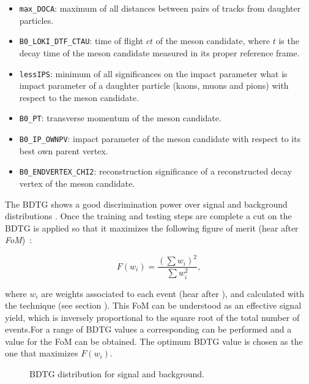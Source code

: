 \begin{itemize}
\item{} \texttt{max\_DOCA}: maximum of all distances between pairs of tracks from daughter particles.
\item{} \texttt{B0\_LOKI\_DTF\_CTAU}: time of flight $ct$ of the \Bs meson candidate, where
$t$ is the decay time of the \Bs meson candidate measured in its proper reference frame.
\item{} \texttt{lessIPS}: minimum of all significances on the impact parameter {\color{red} what is impact parameter} of a daughter particle (kaons, muons and pions) with respect to the \Bs meson candidate.
\item{} \texttt{B0\_PT}: transverse momentum of the \Bs meson candidate.
\item{} \texttt{B0\_IP\_OWNPV}: impact parameter of the \Bs meson candidate with respect to its best own parent vertex.
\item{} \texttt{B0\_ENDVERTEX\_CHI2}: reconstruction significance of a reconstructed decay vertex of the \Bs meson candidate.
\end{itemize}

The BDTG shows a good discrimination power over signal and background distributions .
Once the training and testing steps are complete a cut on the BDTG is applied so that it maximizes the following figure of merit
(hear after {\it FoM})~\cite{Yuehong_fom}:

\begin{equation}
\label{eqn:fom}
F(w_i) = \frac{\left(\sum{w_{i}}\right)^2}{\sum{w_{i}^2}},
\end{equation}

\noindent where $w_i$ are weights associated to each event (hear after \sWeights), and calculated with the \sPlot technique (see section ). 
This FoM can be understood as an effective signal yield, which is inversely proportional to the square root of the total number of events.For a range of BDTG values
a corresponding \sPlot can be performed and a value for the FoM can be obtained. The optimum BDTG value is chosen as the one that maximizes $F(w_i)$.

\begin{figure}[h]
\begin{center}
\caption{BDTG distribution for signal and background.}
\label{BTDG_performance}
\end{center}
\end{figure}

